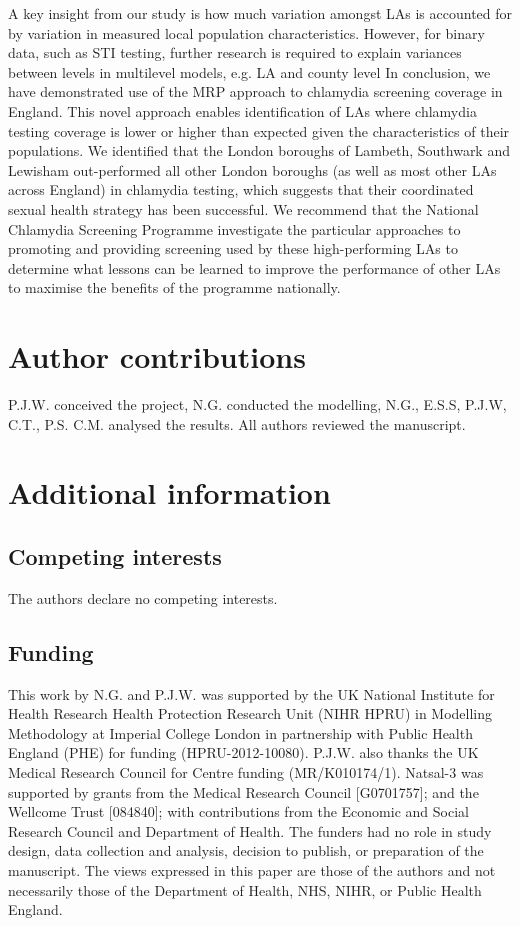 \documentclass[fleqn,10pt]{wlscirep}
\begin{document}
A key insight from our study is how much variation amongst LAs is accounted for by variation in measured local population characteristics. However, for binary data, such as STI testing, further research is required to explain variances between levels in multilevel models, e.g. LA and county level \cite{Gelman2006}
In conclusion, we have demonstrated use of the MRP approach to chlamydia screening coverage in England. This novel approach enables identification of LAs where chlamydia testing coverage is lower or higher than expected given the characteristics of their populations. We identified that the London boroughs of Lambeth, Southwark and Lewisham out-performed all other London boroughs (as well as most other LAs across England) in chlamydia testing, which suggests that their coordinated sexual health strategy \cite{LSLstrategy2014,MEDFASH2008} has been successful. We recommend that the National Chlamydia Screening Programme investigate the particular approaches to promoting and providing screening used by these high-performing LAs to determine what lessons can be learned to improve the performance of other LAs to maximise the benefits of the programme nationally. 



\section*{Author contributions}
P.J.W. conceived the project, N.G. conducted the modelling, N.G., E.S.S, P.J.W, C.T., P.S. C.M. analysed the results. All authors reviewed the manuscript.

\section*{Additional information}
\subsection*{Competing interests}
The authors declare no competing interests.

\subsection*{Funding}
This work by N.G. and P.J.W. was supported by the UK National Institute for Health Research Health Protection Research Unit (NIHR HPRU) in Modelling Methodology at Imperial College London in partnership with Public Health England (PHE) for funding (HPRU-2012-10080). P.J.W. also thanks the UK Medical Research Council for Centre funding (MR/K010174/1). Natsal-3 was supported by grants from the Medical Research Council [G0701757]; and the Wellcome Trust [084840]; with contributions from the Economic and Social Research Council and Department of Health.
The funders had no role in study design, data collection and analysis, decision to publish, or preparation of the manuscript. The views expressed in this paper are those of the authors and not necessarily those of the Department of Health, NHS, NIHR, or Public Health England. 
\end{document}

